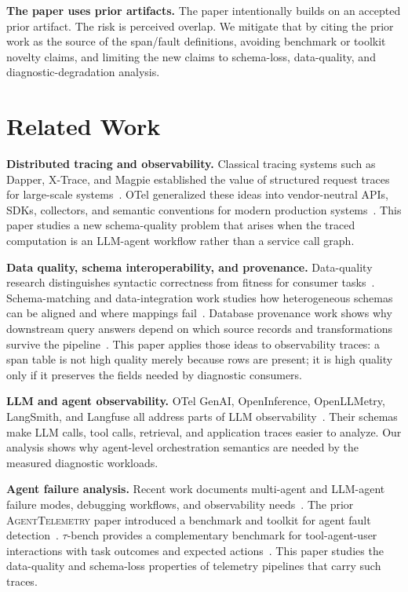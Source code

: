 \documentclass[conference]{IEEEtran}
\begin{document}
\textbf{The paper uses prior artifacts.} The paper intentionally builds
on an accepted prior artifact. The risk is perceived overlap. We
mitigate that by citing the prior work as the source of the span/fault
definitions, avoiding benchmark or toolkit novelty claims, and limiting
the new claims to schema-loss, data-quality, and diagnostic-degradation
analysis.

\section{Related Work}
\label{sec:related}

\textbf{Distributed tracing and observability.} Classical tracing
systems such as Dapper, X-Trace, and Magpie established the value of
structured request traces for large-scale
systems~\cite{dapper,xtrace,magpie}. OTel generalized these ideas into
vendor-neutral APIs, SDKs, collectors, and semantic conventions for
modern production systems~\cite{otel_spec}. This paper studies a new
schema-quality problem that arises when the traced computation is an
LLM-agent workflow rather than a service call graph.

\textbf{Data quality, schema interoperability, and provenance.}
Data-quality research distinguishes syntactic correctness from fitness
for consumer tasks~\cite{wang_strong,batini}. Schema-matching and
data-integration work studies how heterogeneous schemas can be aligned
and where mappings fail~\cite{rahm_bernstein}. Database provenance work
shows why downstream query answers depend on which source records and
transformations survive the pipeline~\cite{cheney_provenance}. This
paper applies those ideas to observability traces: a span table is not
high quality merely because rows are present; it is high quality only if
it preserves the fields needed by diagnostic consumers.

\textbf{LLM and agent observability.} OTel GenAI, OpenInference,
OpenLLMetry, LangSmith, and Langfuse all address parts of LLM
observability~\cite{otel_genai,openllmetry,langsmith,langfuse,openinference}.
Their schemas make LLM calls, tool calls, retrieval, and application
traces easier to analyze. Our analysis shows why agent-level
orchestration semantics are needed by the measured diagnostic workloads.

\textbf{Agent failure analysis.} Recent work documents multi-agent and
LLM-agent failure modes, debugging workflows, and observability
needs~\cite{mast,agentops,agdebugger}. The prior \textsc{AgentTelemetry}
paper introduced a benchmark and toolkit for agent fault
detection~\cite{agenttelemetry_aiware}. $\tau$-bench provides a
complementary benchmark for tool-agent-user interactions with task
outcomes and expected actions~\cite{taubench}. This paper studies the
data-quality and schema-loss properties of telemetry pipelines that
carry such traces.
\end{document}

